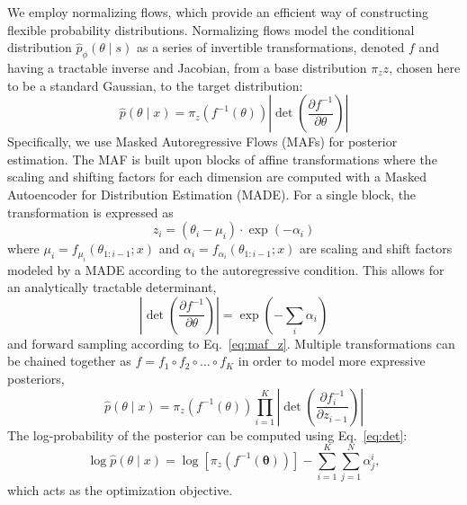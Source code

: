 \documentclass[prd,aps,10pt,nofootinbib,twocolumn,superscriptaddress,preprintnumbers,balancelastpage,longbibliography]{revtex4-1}
\begin{document}
We employ normalizing flows, which provide an efficient way of constructing flexible probability distributions. Normalizing flows model the conditional distribution $\hat p_\phi(\theta\mid s)$ as a series of invertible transformations, denoted $f$ and having a tractable inverse and Jacobian, from a base distribution $\pi_z{z}$, chosen here to be a standard Gaussian, to the target distribution:
\begin{equation}
    \hat{p}({\theta} \mid {x})=\pi_{z}\left(f^{-1}({\theta})\right)\left|\operatorname{det}\left(\frac{\partial f^{-1}}{\partial {\theta}}\right)\right|
\end{equation}
Specifically, we use Masked Autoregressive Flows (MAFs) for posterior estimation. The MAF is built upon blocks of affine transformations where the scaling and shifting factors for each dimension are computed with a Masked Autoencoder for Distribution Estimation (MADE). For a single block, the transformation is expressed as 
\begin{equation}
    \label{eq:maf_z}
    z_{i}=\left(\theta_{i}-\mu_{i}\right) \cdot \exp \left(-\alpha_{i}\right)
\end{equation}
where $\mu_{i}=f_{\mu_{i}}\left({\theta}_{1: i-1} ; {x}\right)$ and $\alpha_i = f_{\alpha_{i}}\left({\theta}_{1: i-1} ; {x}\right)$ are scaling and shift factors modeled by a MADE according to the autoregressive condition. This allows for an analytically tractable determinant,
\begin{equation}
    \label{eq:det}
    \left|\operatorname{det}\left(\frac{\partial f^{-1}}{\partial {\theta}}\right)\right|=\exp \left(-\sum_{i} \alpha_{i}\right)
\end{equation}
and forward sampling according to Eq.~\ref{eq:maf_z}.
Multiple transformations can be chained together as $f=f_{1} \circ f_{2} \circ \ldots \circ f_{K}$ in order to model more expressive posteriors,
\begin{equation}
    \hat{p}({\theta} \mid {x})=\pi_{z}\left(f^{-1}({\theta})\right) \prod_{i=1}^{K}\left|\operatorname{det}\left(\frac{\partial f_{i}^{-1}}{\partial {z}_{i-1}}\right)\right|
\end{equation}
The log-probability of the posterior can be computed using Eq.~\ref{eq:det}:
\begin{equation}
    \log \hat{p}({\theta} \mid {x}) = \log \left[\pi_{z}\left(f^{-1}(\boldsymbol{\theta})\right)\right]-\sum_{i=1}^{K} \sum_{j=1}^{N} \alpha_{j}^{i},
\end{equation}
which acts as the optimization objective.
\end{document}
